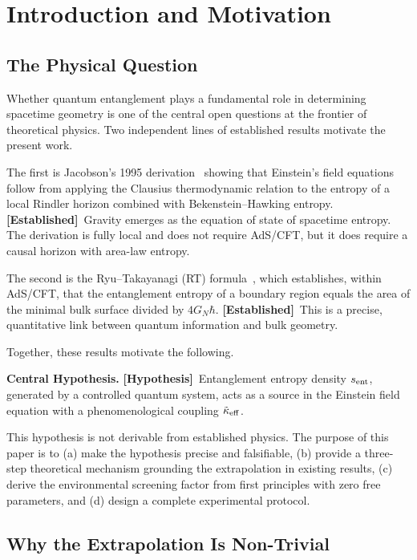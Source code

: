 \documentclass[12pt]{article}
\newcommand{\established}{\textbf{[Established]}}
\newcommand{\hypothesis}{\textbf{[Hypothesis]}}
\begin{document}
\section{Introduction and Motivation}
\label{sec:intro}

\subsection{The Physical Question}

Whether quantum entanglement plays a fundamental role in determining spacetime geometry
is one of the central open questions at the frontier of theoretical physics. Two independent
lines of established results motivate the present work.

The first is Jacobson's 1995 derivation~\cite{Jacobson1995} showing that Einstein's field
equations follow from applying the Clausius thermodynamic relation to the entropy of a
local Rindler horizon combined with Bekenstein--Hawking entropy. \established\ Gravity
emerges as the equation of state of spacetime entropy. The derivation is fully local and
does not require AdS/CFT, but it does require a causal horizon with area-law entropy.

The second is the Ryu--Takayanagi (RT) formula~\cite{RT2006}, which establishes,
within AdS/CFT, that the entanglement entropy of a boundary region equals the area of
the minimal bulk surface divided by $4G_N\hbar$. \established\ This is a precise,
quantitative link between quantum information and bulk geometry.

Together, these results motivate the following.

\medskip
\noindent\textbf{Central Hypothesis.} \hypothesis\ Entanglement entropy density
$s_{\rm ent}$, generated by a controlled quantum system, acts as a source in the
Einstein field equation with a phenomenological coupling
$\tilde{\kappa}_{\rm eff}$.

\medskip

This hypothesis is not derivable from established physics. The purpose of this paper is
to (a) make the hypothesis precise and falsifiable, (b) provide a three-step theoretical
mechanism grounding the extrapolation in existing results, (c) derive the environmental
screening factor from first principles with zero free parameters, and (d) design a
complete experimental protocol.

\subsection{Why the Extrapolation Is Non-Trivial}
\end{document}
